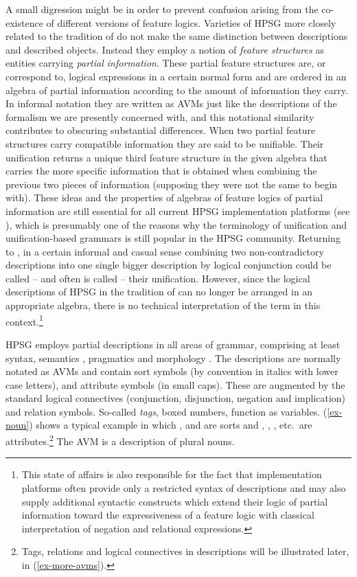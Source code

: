 \documentclass[output=paper
                ,modfonts
                ,nonflat
	        ,collection
	        ,collectionchapter
	        ,collectiontoclongg
 	        ,biblatex
                ,babelshorthands
                ,newtxmath
                ,draftmode
                ,colorlinks, citecolor=brown
]{./langsci/langscibook}
\begin{document}
{A small digression might be in order to prevent confusion arising from
the co-existence of different versions of feature logics.  Varieties
of HPSG more closely related to the tradition of \cite{PollardSag1987}
do not make the same distinction between descriptions and described
objects. Instead they employ a notion of \emph{feature structures} as
entities carrying \emph{partial information}. These partial feature
structures are, or correspond to, logical expressions in a certain
normal form and are ordered in an algebra of partial information
according to the amount of information they carry. In informal
notation they are written as AVMs just like the descriptions of the
formalism we are presently concerned with, and this notational
similarity contributes to obscuring substantial differences.  When two
partial feature structures carry compatible information they are said
to be unifiable. Their unification returns a unique third feature
structure in the given algebra that carries the more specific
information that is obtained when combining the previous two pieces of
information (supposing they were not the same to begin with). These ideas and the
properties of algebras of feature logics of partial information are
still essential for all current HPSG implementation platforms (see ), which
is presumably one of the reasons why the terminology of unification
and unification-based grammars is still popular in the HPSG
community. Returning to \cite{PollardSag1994}, in a certain
informal and casual sense combining two non-contradictory descriptions
into one single bigger description by logical conjunction could be
called -- and often is called -- their unification. However, since the
logical descriptions of HPSG in the tradition of \cite{PollardSag1994}
can no longer be arranged in an appropriate algebra, there is no
technical interpretation of the term in this context.\footnote{This
  state of affairs is also responsible for the fact that
  implementation platforms often provide only a restricted syntax of
  descriptions and may also supply additional syntactic constructs which
  extend their logic of partial information toward the expressiveness of
  a feature logic with classical interpretation of negation and
  relational expressions.}

HPSG employs partial descriptions in all areas of grammar, comprising
at least syntax, semantics , pragmatics  and morphology . The
descriptions are normally notated as AVMs and contain sort symbols (by
convention in italics with lower case letters), and attribute symbols
(in small caps). These are augmented by the standard
logical connectives (conjunction, disjunction, negation and
implication) and relation symbols. So-called \emph{tags}, boxed
numbers, function as variables. (\ref{ex-noun}) shows a typical example
in which ,  and  are sorts and
, , , etc.\ are attributes.\footnote{Tags, relations and logical connectives in descriptions will be illustrated later, in (\ref{ex-more-avms}).}
The AVM is a description of plural nouns.

}
\end{document}
